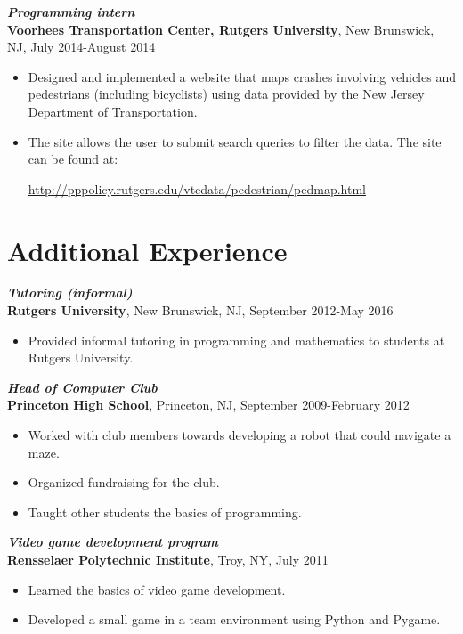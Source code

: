 \documentclass[12pt]{article}
\begin{document}
\textit{\textbf{Programming intern}} \\
\textbf{Voorhees Transportation Center, Rutgers University}, New Brunswick, NJ, July 2014-August 2014
\begin{itemize}
\item
Designed and implemented a website that maps crashes involving vehicles and pedestrians (including bicyclists) using data provided by the New Jersey Department of Transportation.
\item
The site allows the user to submit search queries to filter the data. The site can be found at:
\begin{center}
\url{http://pppolicy.rutgers.edu/vtcdata/pedestrian/pedmap.html}
\end{center}
\end{itemize}


\section*{Additional Experience}

\textit{\textbf{Tutoring (informal)}} \\
\textbf{Rutgers University}, New Brunswick, NJ, September 2012-May 2016
\begin{itemize}
\item
Provided informal tutoring in programming and mathematics to students at Rutgers University.
\end{itemize}

\textit{\textbf{Head of Computer Club}} \\
\textbf{Princeton High School}, Princeton, NJ, September 2009-February 2012
\begin{itemize}
\item
Worked with club members towards developing a robot that could navigate a maze.
\item
Organized fundraising for the club.
\item
Taught other students the basics of programming.
\end{itemize}

\textit{\textbf{Video game development program}} \\
\textbf{Rensselaer Polytechnic Institute}, Troy, NY, July 2011
\begin{itemize}
\item
Learned the basics of video game development.
\item
Developed a small game in a team environment using Python and Pygame.
\end{itemize}
\end{document}
